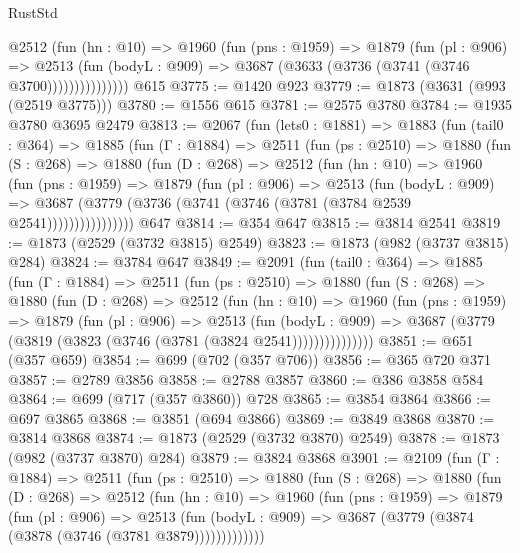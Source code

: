 \begin{lexlean}{RustStd}
\begin{coremodule}
                @2512
                  (fun (hn : @10) =>
                  @1960
                    (fun (pns : @1959) =>
                    @1879
                      (fun (pl : @906) =>
                      @2513
                        (fun (bodyL : @909) =>
                        @3687 (@3633 (@3736 (@3741 (@3746 @3700)))))))))))))))
    @615
@3775 := @1420 @923
@3779 := @1873 (@3631 (@993 (@2519 @3775)))
@3780 := @1556 @615
@3781 := @2575 @3780
@3784 := @1935 @3780 @3695 @2479
@3813 := @2067
    (fun (lets0 : @1881) =>
    @1883
      (fun (tail0 : @364) =>
      @1885
        (fun (Γ : @1884) =>
        @2511
          (fun (ps : @2510) =>
          @1880
            (fun (S : @268) =>
            @1880
              (fun (D : @268) =>
              @2512
                (fun (hn : @10) =>
                @1960
                  (fun (pns : @1959) =>
                  @1879
                    (fun (pl : @906) =>
                    @2513
                      (fun (bodyL : @909) =>
                      @3687 (@3779 (@3736 (@3741 (@3746 (@3781 (@3784 @2539 @2541))))))))))))))))
    @647
@3814 := @354 @647
@3815 := @3814 @2541
@3819 := @1873 (@2529 (@3732 @3815) @2549)
@3823 := @1873 (@982 (@3737 @3815) @284)
@3824 := @3784 @647
@3849 := @2091
    (fun (tail0 : @364) =>
    @1885
      (fun (Γ : @1884) =>
      @2511
        (fun (ps : @2510) =>
        @1880
          (fun (S : @268) =>
          @1880
            (fun (D : @268) =>
            @2512
              (fun (hn : @10) =>
              @1960
                (fun (pns : @1959) =>
                @1879
                  (fun (pl : @906) =>
                  @2513
                    (fun (bodyL : @909) =>
                    @3687 (@3779 (@3819 (@3823 (@3746 (@3781 (@3824 @2541)))))))))))))))
@3851 := @651 (@357 @659)
@3854 := @699 (@702 (@357 @706))
@3856 := @365 @720 @371
@3857 := @2789 @3856
@3858 := @2788 @3857
@3860 := @386 @3858 @584
@3864 := @699 (@717 (@357 @3860)) @728
@3865 := @3854 @3864
@3866 := @697 @3865
@3868 := @3851 (@694 @3866)
@3869 := @3849 @3868
@3870 := @3814 @3868
@3874 := @1873 (@2529 (@3732 @3870) @2549)
@3878 := @1873 (@982 (@3737 @3870) @284)
@3879 := @3824 @3868
@3901 := @2109
    (fun (Γ : @1884) =>
    @2511
      (fun (ps : @2510) =>
      @1880
        (fun (S : @268) =>
        @1880
          (fun (D : @268) =>
          @2512
            (fun (hn : @10) =>
            @1960
              (fun (pns : @1959) =>
              @1879
                (fun (pl : @906) =>
                @2513
                  (fun (bodyL : @909) => @3687 (@3779 (@3874 (@3878 (@3746 (@3781 @3879)))))))))))))

\end{coremodule}
\end{lexlean}
